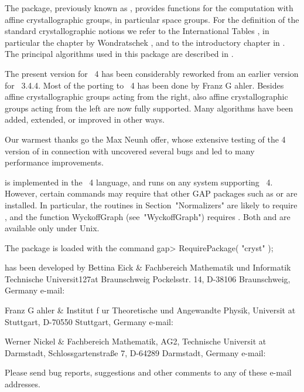 

The {\Cryst} package, previously known as , provides 
functions for the computation with affine crystallographic groups, 
in particular space groups. For the definition of the standard 
crystallographic notions we refer to the International Tables 
\cite{Hah95}, in particular the chapter by Wondratschek \cite{Won95},
and to the introductory chapter in \cite{BBNWZ78}. The principal 
algorithms used in this package are described in \cite{EGN97}.

The present version for {\GAP}~4 has been considerably reworked from
an earlier version for {\GAP}~3.4.4. Most of the porting to {\GAP}~4
has been done by Franz G{ a}hler. Besides affine crystallographic
groups acting from the right, also affine crystallographic groups acting 
from the left are now fully supported. Many algorithms have been added, 
extended, or improved in other ways.

Our warmest thanks go the Max Neunh{ o}ffer, whose extensive
testing of the {\GAP} 4 version of {\Cryst} in connection with {\XGAP} 
uncovered several bugs and led to many performance improvements.

{\Cryst} is implemented in the {\GAP}~4 language, and runs on any 
system supporting {\GAP}~4. However, certain commands may require 
that other GAP packages such as {\CARAT} or {\XGAP} are installed.
In particular, the routines in Section~"Normalizers" are likely
to require {\CARAT}, and the function WyckoffGraph (see~"WyckoffGraph")
requires {\XGAP}. Both {\CARAT} and {\XGAP} are available only under Unix.

The {\Cryst} package is loaded with the command
\beginexample 
     gap> RequirePackage( "cryst" ); 
\endexample

{\Cryst} has been developed by
\beginitems
Bettina Eick &
Fachbereich Mathematik und Informatik\hfil\break
Technische Universit\accent127at Braunschweig\hfil\break
Pockelsstr. 14, D-38106 Braunschweig, Germany\hfil\break
e-mail: 

Franz G{ a}hler &
Institut f{ u}r Theoretische und Angewandte Physik,\hfil\break
Universit{ a}t Stuttgart,
D-70550 Stuttgart, Germany \hfill\break
e-mail: 

Werner Nickel &
Fachbereich Mathematik, AG2,
Technische Universit{ a}t Darmstadt, \hfill\break
Schlossgartenstra{\ss}e 7, D-64289 Darmstadt, Germany \hfil\break
e-mail: 
\enditems

Please send bug reports, suggestions and other comments to any of these
e-mail addresses.







